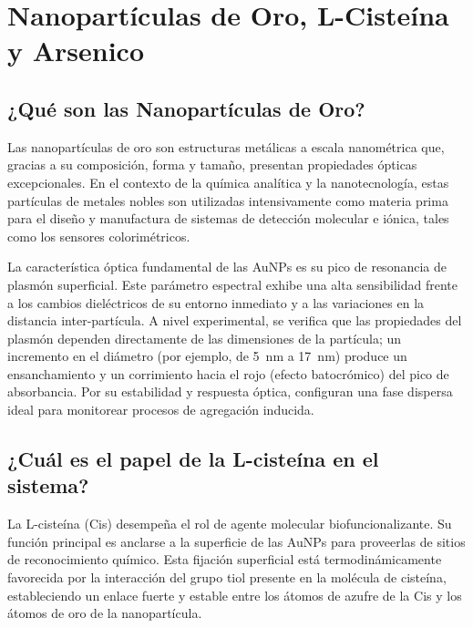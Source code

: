 \section{Nanopartículas de Oro, L-Cisteína y Arsenico}

\subsection{¿Qué son las Nanopartículas de Oro?}

Las nanopartículas de oro son estructuras metálicas a escala nanométrica que,
gracias a su composición, forma y tamaño, presentan propiedades ópticas
excepcionales. En el contexto de la química analítica y la nanotecnología,
estas partículas de metales nobles son utilizadas intensivamente como materia
prima para el diseño y manufactura de sistemas de detección molecular e iónica,
tales como los sensores colorimétricos.

La característica óptica fundamental de las AuNPs es su pico de resonancia de
plasmón superficial. Este parámetro espectral exhibe una alta sensibilidad
frente a los cambios dieléctricos de su entorno inmediato y a las variaciones
en la distancia inter-partícula. A nivel experimental, se verifica que las
propiedades del plasmón dependen directamente de las dimensiones de la
partícula; un incremento en el diámetro (por ejemplo, de \qty{5}{\nano\metre} a
\qty{17}{\nano\metre}) produce un ensanchamiento y un corrimiento hacia el rojo
(efecto batocrómico) del pico de absorbancia. Por su estabilidad y respuesta
óptica, configuran una fase dispersa ideal para monitorear procesos de
agregación inducida.

\subsection{¿Cuál es el papel de la L-cisteína en el sistema?}

La L-cisteína (Cis) desempeña el rol de agente molecular biofuncionalizante. Su
función principal es anclarse a la superficie de las AuNPs para proveerlas de
sitios de reconocimiento químico. Esta fijación superficial está
termodinámicamente favorecida por la interacción del grupo tiol presente en la
molécula de cisteína, estableciendo un enlace fuerte y estable entre los átomos
de azufre de la Cis y los átomos de oro de la nanopartícula.


